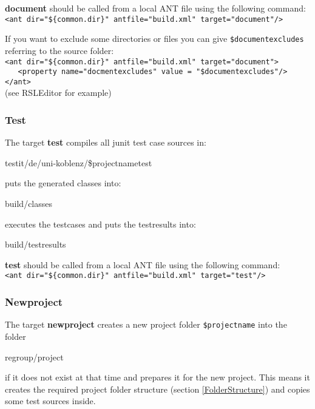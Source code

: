 \documentclass
[
		a4paper,
		twoside, 										
		BCOR10mm,											
		11pt,												
		halfparskip,								
		bigheadings,								
		notitlepage,			
		pdftex											
]
{scrartcl}
\begin{document}
\textbf{document} should be called from a local ANT file using the following command:\\
\footnotesize
\verb|<ant dir="${common.dir}" antfile="build.xml" target="document"/>|
\normalsize

If you want to exclude some directories or files you can give \texttt{\$documentexcludes} referring to the source folder:\\
\footnotesize
\verb|<ant dir="${common.dir}" antfile="build.xml" target="document">|\\ \verb|   <property name="docmentexcludes" value = "$documentexcludes"/>|\\ \verb|</ant>|
\normalsize
\\(see RSLEditor for example)


\subsubsection{Test}
\label{Test}

The target \textbf{test} compiles all junit test case sources in:
\footnotesize
\begin{compactitem}
	\item testit/de/uni-koblenz/\$projectnametest
\end{compactitem}
\normalsize
puts the generated classes into:
\footnotesize
\begin{compactitem}
	\item build/classes
\end{compactitem}
\normalsize
executes the testcases and puts the testresults into:
\footnotesize
\begin{compactitem}
	\item build/testresults
\end{compactitem}
\normalsize

\textbf{test} should be called from a local ANT file using the following command:\\
\footnotesize
\verb|<ant dir="${common.dir}" antfile="build.xml" target="test"/>|
\normalsize


\subsubsection{Newproject}
\label{Newproject}

The target \textbf{newproject} creates a new project folder \texttt{\$projectname} into the folder 
\footnotesize
\begin{compactitem}
	\item regroup/project
\end{compactitem}
\normalsize
if it does not exist at that time and prepares it for the new project. This means it creates the required project folder structure (section \ref{FolderStructure}) and copies some test sources inside.
\end{document}
